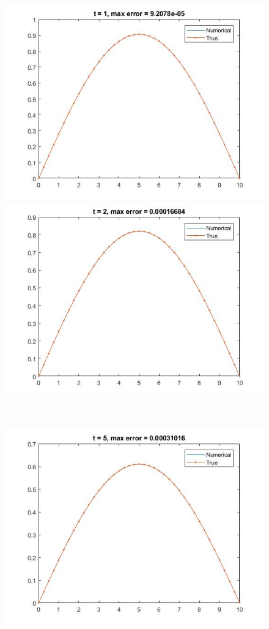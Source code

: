 \begin{figure}
\begin{minipage}{0.5\textwidth}
\includegraphics[width = \textwidth]{12.jpg}
\end{minipage}
\begin{minipage}{0.5\textwidth}
\includegraphics[width = \textwidth]{13.jpg}
\end{minipage} \\
\begin{minipage}{0.5\textwidth}
\includegraphics[width = \textwidth]{14.jpg}

\end{minipage}
\end{figure}
